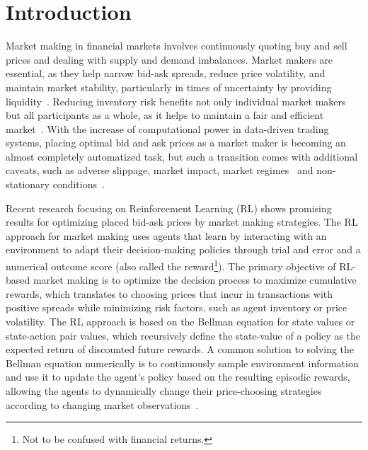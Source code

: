 \section{Introduction}
\label{sec:introduction}

Market making in financial markets involves continuously quoting buy and sell prices and dealing with supply and demand imbalances.
Market makers are essential, as they help narrow bid-ask spreads, reduce price volatility, and maintain market stability,
particularly in times of uncertainty by providing liquidity~\cite{Glosten1985, OHara1995}.
Reducing inventory risk benefits not only individual market makers but all participants as a whole,
as it helps to maintain a fair and efficient market~\cite{Glosten1985, OHara1995}.
With the increase of computational power in data-driven trading systems,
placing optimal bid and ask prices as a market maker is becoming an almost completely automatized task,
but such a transition comes with additional caveats, such as adverse slippage, market impact, market regimes~\cite{Cont2010, Bouchaud2018}
and non-stationary conditions~\cite{Gasperov2021}.

Recent research focusing on Reinforcement Learning (RL) shows promising results for optimizing placed bid-ask prices by market making strategies.
The RL approach for market making uses agents that learn by interacting with an environment
to adapt their decision-making policies through trial and error and a numerical outcome score
(also called the reward\footnote{Not to be confused with financial returns.}).
The primary objective of RL-based market making is to optimize the decision process to maximize cumulative rewards,
which translates to choosing prices that incur in transactions with positive spreads while minimizing risk factors, such as agent inventory or price volatility.
The RL approach is based on the Bellman equation for state values or state-action pair values,
which recursively define the state-value of a policy as the expected return of discounted future rewards.
A common solution to solving the Bellman equation numerically is to continuously sample environment information and
use it to update the agent's policy based on the resulting episodic rewards,
allowing the agents to dynamically change their price-choosing strategies according to changing market observations~\cite{Sutton2018}.

